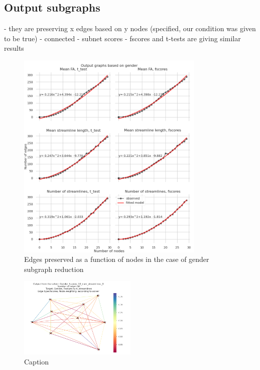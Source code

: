 \documentclass[msthesis.tex]{subfiles}
\begin{document}
\subsection{Output subgraphs}

- they are preserving x edges based on y nodes (specified, our condition was given to be true)
- connected
- subnet scores
- fscores and t-tests are giving similar results
\begin{figure}
    \centering
    \includegraphics[width=0.8\textwidth]{images/Gender_nodes_preserved.png}
    \caption{Edges preserved as a function of nodes in the case of gender subgraph reduction}
    \label{fig:fun_num_edges}
\end{figure}
\begin{figure}
    \centering
    \includegraphics[width=0.5\textwidth]{images/gender10nodes.png}
    \caption{Caption}
    \label{fig:solver_based_gender_10}
\end{figure}
\end{document}
